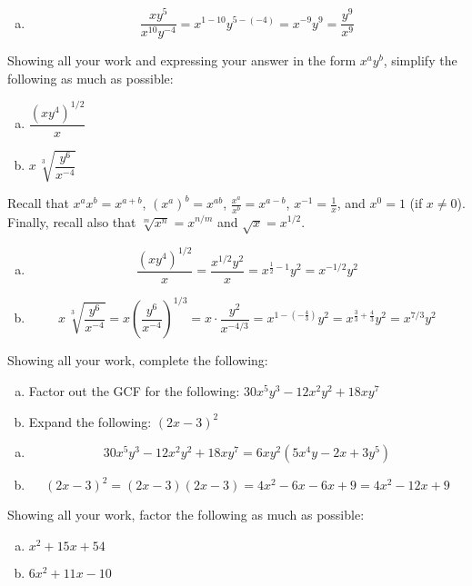 \documentclass[12pt,letterpaper]{exam}
\begin{document}
\begin{questions}
\begin{enumerate}[(a)]
\item 
	\[
	\dfrac{x y^5}{x^{10} y^{-4}}= x^{1-10} y^{5-(-4)}= x^{-9} y^9= \dfrac{y^9}{x^9}
	\]
\end{enumerate}



\newpage
\question[10] Showing all your work and expressing your answer in the form $x^a y^b$, simplify the following as much as possible:
	\begin{enumerate}[(a)]
	\item $\dfrac{(xy^4)^{1/2}}{x}$
	\item $x \, \sqrt[3]{\dfrac{y^6}{x^{-4}}}$
	\end{enumerate} \pspace

\sol Recall that $x^a x^b= x^{a+b}$, $(x^a)^b= x^{ab}$, $\frac{x^a}{x^b}= x^{a-b}$, $x^{-1}= \frac{1}{x}$, and $x^0= 1$ (if $x \neq 0$). Finally, recall also that $\sqrt[m]{x^n}= x^{n/m}$ and $\sqrt{x}= x^{1/2}$. \pspace

\begin{enumerate}[(a)]
\item 
	\[
	\dfrac{(xy^4)^{1/2}}{x}= \dfrac{x^{1/2} y^2}{x}= x^{\frac{1}{2} - 1} y^2= x^{-1/2} y^2
	\] \pspace

\item 
	\[
	x \, \sqrt[3]{\dfrac{y^6}{x^{-4}}}= x \left( \dfrac{y^6}{x^{-4}} \right)^{1/3}= x \cdot \dfrac{y^2}{x^{-4/3}}= x^{1 - (-\frac{4}{3})} y^2= x^{\frac{3}{3} + \frac{4}{3}} y^2= x^{7/3} y^2
	\]
\end{enumerate}



\newpage
\question[10] Showing all your work, complete the following:
	\begin{enumerate}[(a)]
	\item Factor out the GCF for the following: $30x^5 y^3 - 12x^2 y^2 + 18xy^7$
	\item Expand the following: $(2x - 3)^2$
	\end{enumerate} \pspace

\sol 
\begin{enumerate}[(a)]
\item 
	\[
	30x^5 y^3 - 12x^2 y^2 + 18xy^7= 6xy^2 (5x^4y - 2x + 3y^5)
	\] \pspace

\item 
	\[
	(2x - 3)^2= (2x - 3)(2x - 3)= 4x^2 - 6x - 6x + 9= 4x^2 - 12x + 9
	\]
\end{enumerate}



\newpage
\question[10] Showing all your work, factor the following as much as possible:
	\begin{enumerate}[(a)]
	\item $x^2 + 15x + 54$
	\item $6x^2 + 11x - 10$
	\end{enumerate} \pspace


\end{questions}
\end{document}
